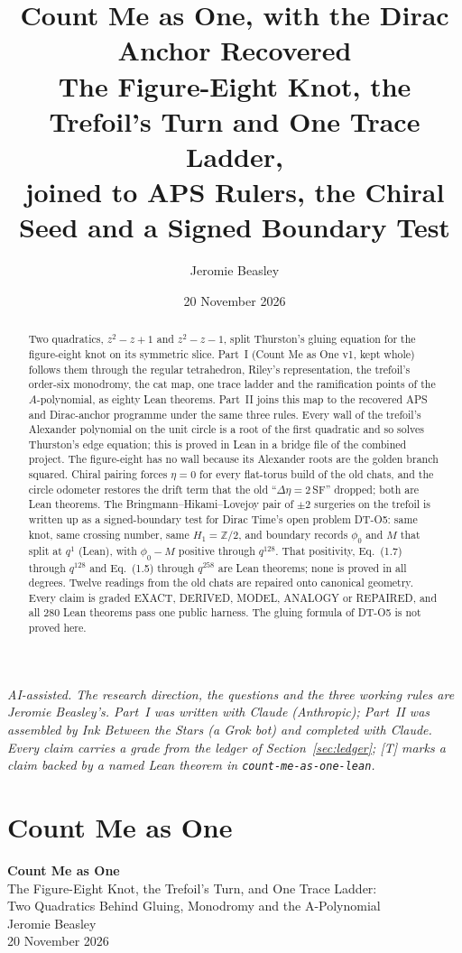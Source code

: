 \documentclass[11pt]{article}
\title{\textbf{Count Me as One, with the Dirac Anchor Recovered}\\[4pt]\large The Figure-Eight Knot, the Trefoil's Turn and One Trace Ladder,\\ joined to APS Rulers, the Chiral Seed and a Signed Boundary Test}
\author{Jeromie Beasley}
\date{20 November 2026}
\theoremstyle{definition}
\begin{document}
\maketitle

\noindent\small\textit{AI-assisted. The research direction, the questions and the three working rules are Jeromie Beasley's. Part~I was written with Claude (Anthropic); Part~II was assembled by Ink Between the Stars (a Grok bot) and completed with Claude. Every claim carries a grade from the ledger of Section~\ref{sec:ledger}; \textsf{[T]} marks a claim backed by a named Lean theorem in \texttt{count-me-as-one-lean}.}\normalsize

\begin{abstract}
Two quadratics, $z^2-z+1$ and $z^2-z-1$, split Thurston's gluing equation for the figure-eight knot on its symmetric slice. Part~I (Count Me as One v1, kept whole) follows them through the regular tetrahedron, Riley's representation, the trefoil's order-six monodromy, the cat map, one trace ladder and the ramification points of the $A$-polynomial, as eighty Lean theorems. Part~II joins this map to the recovered APS and Dirac-anchor programme under the same three rules. Every wall of the trefoil's Alexander polynomial on the unit circle is a root of the first quadratic and so solves Thurston's edge equation; this is proved in Lean in a bridge file of the combined project. The figure-eight has no wall because its Alexander roots are the golden branch squared. Chiral pairing forces $\eta=0$ for every flat-torus build of the old chats, and the circle odometer restores the drift term that the old ``$\Delta\eta=2\,$SF'' dropped; both are Lean theorems. The Bringmann--Hikami--Lovejoy pair of $\pm2$ surgeries on the trefoil is written up as a signed-boundary test for Dirac Time's open problem DT-O5: same knot, same crossing number, same $H_1=\mathbb Z/2$, and boundary records $\phi_0$ and $M$ that split at $q^1$ (Lean), with $\phi_0-M$ positive through $q^{128}$. That positivity, Eq.~(1.7) through $q^{128}$ and Eq.~(1.5) through $q^{258}$ are Lean theorems; none is proved in all degrees. Twelve readings from the old chats are repaired onto canonical geometry. Every claim is graded EXACT, DERIVED, MODEL, ANALOGY or REPAIRED, and all 280 Lean theorems pass one public harness. The gluing formula of DT-O5 is not proved here.
\end{abstract}

\tableofcontents
\clearpage
\part{Count Me as One}
\begin{center}\textbf{Count Me as One}\\[4pt]\large The Figure-Eight Knot, the Trefoil's Turn, and One Trace Ladder:\\ Two Quadratics Behind Gluing, Monodromy and the A-Polynomial\\[6pt]\normalsize Jeromie Beasley\\ 20 November 2026\end{center}
\end{document}
